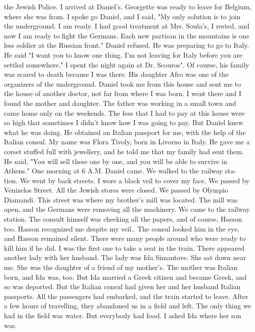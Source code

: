 the Jewish Police.
I arrived at Daniel's.
Georgette was ready to leave 
for Belgium, where she was from.
I spoke go Daniel, and I said, "My 
only solution is to join the underground.
I am ready.
I had good treatment
at Mrs.
Soula's, I rested, and now I am ready to fight the Germans.
Each new partisan in the mountains is one less soldier at the Russian 
front."
Daniel refused.
He was preparing to go to Italy.
He said "I 
want you to know one thing.
I'm not leaving for Italy before you are 
settled somewhere."
I spent the night again at Dr.
Scouros".
Of course, his family was 
scared to death because I was there.
His daughter Afro was one of the 
organizers of the underground.
Daniel took me from this house and sent 
me to the house of another doctor, not far from where I was born.
I 
went there and I found the mother and daughter.
The father was working 
in a small town and came home only on the weekends.
The fees that I had 
to pay at this house were so high that sometimes I didn't know how I was going to pay.
But Daniel knew what he was doing.
He obtained an Italian passport for me, with the help of the Italian consul.
My name was Flora Tivoly, born in Livorno in Italy.
He gave me a corset stuffed full with jewellery, and he told me that my family had sent them.
He said, 
"You will sell these one by one, and you will be able to survive in 
Athens."
One morning at 6 A.M.
Daniel came.
We walked to the railway sta-
tion.
We went by back streets.
I wore a black veil to cover my face.
We passed by Venizelos Street.
All the Jewish stores were closed.
We 
passed by Olympio Diamandi.
This street was where my brother's mill was 
located.
The mill was open, and the Germans were removing all the machinery.
We came to the railway station.
The consult himself was checking all the papers, and of course, Hasson too.
Hasson recognized me despite my veil.. The consul looked him in the eye, and Hasson remained silent.
There were many people around who were ready to kill him if he 
did.
I was the first one to take a seat in the train.
There appeared 
another lady with her husband.
The lady was Ida Simantove.
She sat 
down near me.
She was the daughter of a friend of my mother's.
The mother was Italian born, and Ida was, too.
But Ida married a Greek citizen and became Greek, and so was deported.
But the Italian consul had given her and her husband Italian passports.
All the passengers had embarked, and the train started to leave.
After a few hours of travelling, they abandoned us in a field and left.
The only thing we had in the field was water.
But everybody had food.
I asked Ida where her son was.

